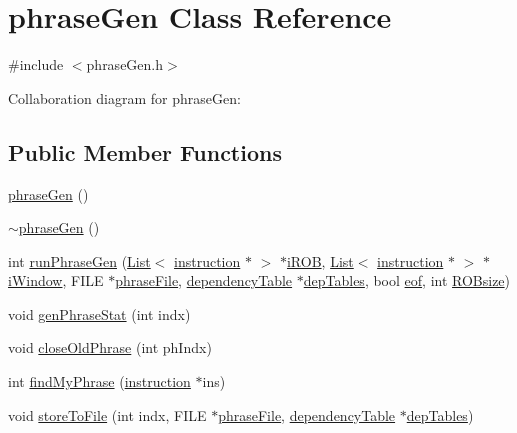 \hypertarget{classphraseGen}{
\section{phraseGen Class Reference}
\label{classphraseGen}
}


{\ttfamily \#include $<$phraseGen.h$>$}



Collaboration diagram for phraseGen:
\subsection*{Public Member Functions}
\begin{DoxyCompactItemize}
\item 
\hyperlink{classphraseGen_a94e47ed50271fd9e5f5335a1160b7216}{phraseGen} ()
\item 
\hyperlink{classphraseGen_a348ab4d28c08b7e77241cd0c7a0f3796}{$\sim$phraseGen} ()
\item 
int \hyperlink{classphraseGen_a27c8b0d81592bc45e7f25e9cb7a4d1c4}{runPhraseGen} (\hyperlink{classList}{List}$<$ \hyperlink{classinstruction}{instruction} $\ast$ $>$ $\ast$\hyperlink{backend_2parser_8cpp_ad73ae25f81e6e99482f3fbd5ba9664ce}{iROB}, \hyperlink{classList}{List}$<$ \hyperlink{classinstruction}{instruction} $\ast$ $>$ $\ast$\hyperlink{backend_2parser_8cpp_a901b5b3874c558101a1c250f2f2d0662}{iWindow}, FILE $\ast$\hyperlink{bkEnd_8cpp_a77fc2d35c5f7077be762435e06e16bd2}{phraseFile}, \hyperlink{classdependencyTable}{dependencyTable} $\ast$\hyperlink{vliwScheduler_8cpp_ab1dae06b10269a1b683512c8ecb25def}{depTables}, bool \hyperlink{backend_2parser_8cpp_a6c052602d1d43227768ad3807f7b7268}{eof}, int \hyperlink{bkEnd_8cpp_a06a6e046fd7b9a66b03d334b1df5e3ad}{ROBsize})
\item 
void \hyperlink{classphraseGen_a8aa6ac2c304d3545c10da7c70ae6445d}{genPhraseStat} (int indx)
\item 
void \hyperlink{classphraseGen_a35e9879ba8c8931661e112c579ead2b4}{closeOldPhrase} (int phIndx)
\item 
int \hyperlink{classphraseGen_a04d54cfe18dfef407499f3e6829c32d3}{findMyPhrase} (\hyperlink{classinstruction}{instruction} $\ast$ins)
\item 
void \hyperlink{classphraseGen_aba7134610613016de2d7d91d47c5dd4e}{storeToFile} (int indx, FILE $\ast$\hyperlink{bkEnd_8cpp_a77fc2d35c5f7077be762435e06e16bd2}{phraseFile}, \hyperlink{classdependencyTable}{dependencyTable} $\ast$\hyperlink{vliwScheduler_8cpp_ab1dae06b10269a1b683512c8ecb25def}{depTables})

\end{DoxyCompactItemize}
